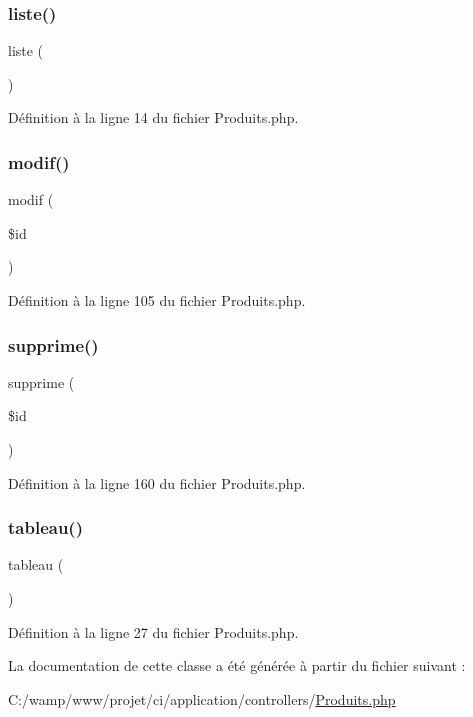 \subsubsection{\texorpdfstring{liste()}{liste()}}
{\footnotesize\ttfamily liste (\begin{DoxyParamCaption}{ }\end{DoxyParamCaption})}



Définition à la ligne 14 du fichier Produits.\+php.

\mbox{\label{class_produits_a295587c8d90d190e24c17e5101cbf144}} 
\subsubsection{\texorpdfstring{modif()}{modif()}}
{\footnotesize\ttfamily modif (\begin{DoxyParamCaption}\item[{}]{\$id }\end{DoxyParamCaption})}



Définition à la ligne 105 du fichier Produits.\+php.

\mbox{\label{class_produits_a8a2f1b91be82fb6ce2bd53b59cc00e69}} 
\subsubsection{\texorpdfstring{supprime()}{supprime()}}
{\footnotesize\ttfamily supprime (\begin{DoxyParamCaption}\item[{}]{\$id }\end{DoxyParamCaption})}



Définition à la ligne 160 du fichier Produits.\+php.

\mbox{\label{class_produits_a19423df8485a23548fa7d8a043438261}} 
\subsubsection{\texorpdfstring{tableau()}{tableau()}}
{\footnotesize\ttfamily tableau (\begin{DoxyParamCaption}{ }\end{DoxyParamCaption})}



Définition à la ligne 27 du fichier Produits.\+php.



La documentation de cette classe a été générée à partir du fichier suivant \+:\begin{DoxyCompactItemize}
\item 
C\+:/wamp/www/projet/ci/application/controllers/\mbox{\hyperlink{_produits_8php}{Produits.\+php}}\end{DoxyCompactItemize}
